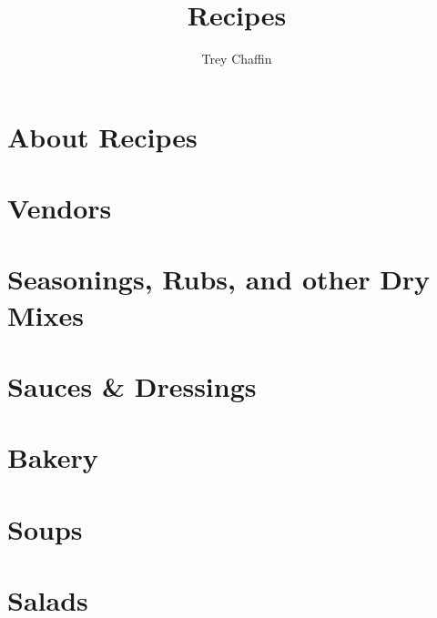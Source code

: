 \documentclass{article}
\title{Recipes}
\author{Trey Chaffin}
\begin{document}
\thispagestyle{empty}

\newpage{}

\tableofcontents
{}
\clearpage
{}

\section{About Recipes}


\section{Vendors}
\newpage{}

\section{Seasonings, Rubs, and other Dry Mixes}

\newpage{}

\section{Sauces \& Dressings}


\newpage{}

\newpage{}

\newpage{}
\newpage{}

\section{Bakery}

\newpage{}

\section{Soups}
\newpage{}
 \newpage{}

\section{Salads}

\newpage{}

\newpage{}
\newpage{}
\end{document}
